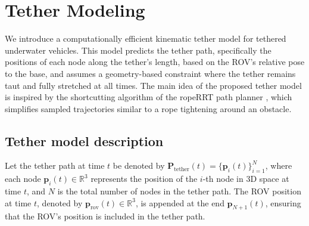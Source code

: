 \section{Tether Modeling}
\label{sec:tether_model}

 We introduce a computationally efficient kinematic tether model for tethered underwater vehicles. This model predicts the tether path, specifically the positions of each node along the tether's length, based on the \ac{ROV}'s relative pose to the base, and assumes a geometry-based constraint where the tether remains taut and fully stretched at all times. The main idea of the proposed tether model is inspired by the shortcutting algorithm of the ropeRRT path planner \cite{roperrt}, which simplifies sampled trajectories similar to a rope tightening around an obstacle. 


\subsection{Tether model description}
Let the tether path at time \( t \) be denoted by \( \mathbf{P}_{\mathrm{tether}}(t) = \{ \mathbf{p}_i(t) \}_{i=1}^{N} \), where each node \( \mathbf{p}_i(t) \in \mathbb{R}^3 \) represents the position of the \( i \)-th node in 3D space at time \( t \), and \( N \) is the total number of nodes in the tether path. The \ac{ROV} position at time \( t \), denoted by \( \mathbf{p}_{\mathrm{rov}}(t) \in \mathbb{R}^3 \), is appended at the end \( \mathbf{p}_{N+1}(t) \), ensuring that the \ac{ROV}'s position is included in the tether path. 

